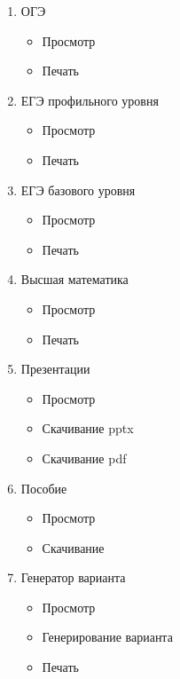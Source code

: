 \begin{enumerate}
  \item ОГЭ
  \begin{itemize}
    \item Просмотр
    \item Печать
  \end{itemize}

  \item ЕГЭ профильного уровня
  \begin{itemize}
    \item Просмотр
    \item Печать
  \end{itemize}

  \item ЕГЭ базового уровня
  \begin{itemize}
    \item Просмотр
    \item Печать
  \end{itemize}

  \item Высшая математика
  \begin{itemize}
    \item Просмотр
    \item Печать
  \end{itemize}

  \item Презентации
  \begin{itemize}
    \item Просмотр
    \item Скачивание pptx
    \item Скачивание pdf
  \end{itemize}

  \item Пособие
  \begin{itemize}
    \item Просмотр
    \item Скачивание
  \end{itemize}

  \item Генератор варианта
  \begin{itemize}
    \item Просмотр
    \item Генерирование варианта
    \item Печать
  \end{itemize}
\end{enumerate}

